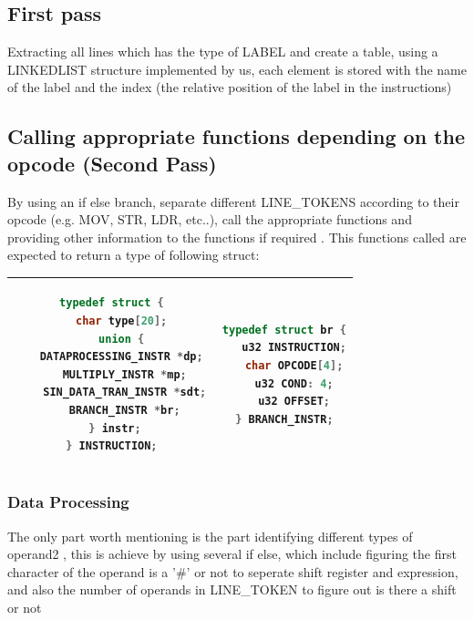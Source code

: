 \documentclass[11pt]{article}
\begin{document}
\subsection{First pass}
Extracting all lines which has the type of LABEL and create a table, using a LINKEDLIST structure implemented by us, each element is stored with the name of the label and the index (the relative position of the label in the instructions)
\subsection{Calling appropriate functions depending on the opcode (Second Pass)}
By using an if else branch, separate different LINE{\_}TOKENS according to their opcode (e.g. MOV, STR, LDR, etc..), call the appropriate functions and providing other information to the functions if required . This functions called are expected to return a type of following struct: 

\begin{center}
\begin{tabular}{|c|c|}
\hline
\begin{lstlisting}[language = C]
typedef struct {
   char type[20];
   union {
	DATAPROCESSING_INSTR *dp; 
	MULTIPLY_INSTR *mp;
	SIN_DATA_TRAN_INSTR *sdt;
	BRANCH_INSTR *br;
   } instr;  
} INSTRUCTION;
\end{lstlisting} &

\begin{lstlisting}[language = C]
typedef struct br {
   u32 INSTRUCTION;
   char OPCODE[4];
   u32 COND: 4;
   u32 OFFSET;
} BRANCH_INSTR;
\end{lstlisting}\\
\hline

\end{tabular}
\end{center}

\subsubsection{Data Processing}
The only part worth mentioning is the part identifying different types of operand2 , this is achieve by using several if else, which include figuring the first character of the operand is a '\#' or not to seperate shift register and expression, and also the number of operands in LINE{\_}TOKEN to figure out is there a shift or not
\end{document}
